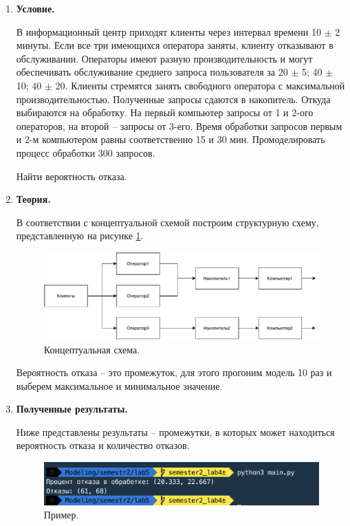 \documentclass[a4paper,14pt]{extreport} %
\begin{document}
\begin{enumerate}

\item \textbf{Условие. }

В информационный центр приходят клиенты через интервал времени 10 $\pm$ 2 минуты. Если все три имеющихся оператора заняты, клиенту отказывают в обслуживании. Операторы имеют разную производительность и могут обеспечивать обслуживание среднего запроса пользователя за 20 $\pm$ 5; 40 $\pm$ 10; 40 $\pm$ 20. Клиенты стремятся занять свободного оператора с максимальной производительностью. Полученные запросы сдаются в накопитель. Откуда выбираются на обработку. На первый компьютер запросы от 1 и 2-ого операторов, на второй -- запросы от 3-его. Время обработки запросов первым и 2-м компьютером равны соответственно 15 и 30 мин. Промоделировать процесс обработки 300 запросов. 

Найти вероятность отказа. 

\item \textbf{Теория. }

В соответствии с концептуальной схемой построим структурную схему, представленную на рисунке \ref{model}. 

\begin{figure}[H]
  \centering
  \includegraphics[scale=0.9]{model}
  \caption{Концептуальная схема.  }
  \label{model}
\end{figure}

Вероятность отказа -- это промежуток, для этого прогоним модель 10 раз и выберем максимальное и минимальное значение. 

\newpage

\item \textbf{Полученные результаты. }

Ниже представлены результаты -- промежутки, в которых может находиться вероятность отказа и количество отказов. 

\begin{figure}[H]
  \centering
  \includegraphics[scale=0.7]{1}
  \caption{Пример. }
\end{figure}



\end{enumerate}
\end{document}
